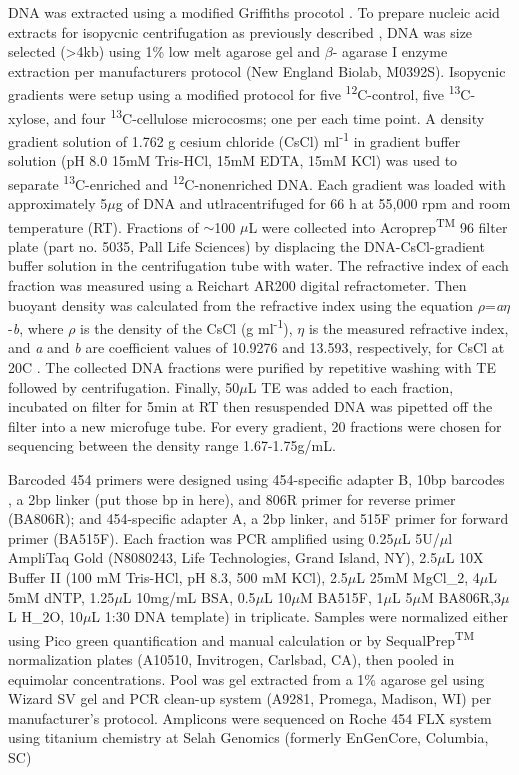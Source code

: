 DNA was extracted using a modified Griffiths procotol \cite{Griffiths_2000}. To prepare nucleic acid extracts for isopycnic centrifugation as previously described \cite{Buckley_2007}, DNA was size selected (\textgreater4kb) using 1\% low melt agarose gel and $\beta$- agarase I enzyme extraction per manufacturers protocol (New England Biolab, M0392S). Isopycnic gradients were setup using a modified protocol \cite{Neufeld_2007} for five \textsuperscript{12}C-control, five \textsuperscript{13}C-xylose, and four \textsuperscript{13}C-cellulose microcosms; one per each time point. A density gradient solution of 1.762 g cesium chloride (CsCl) ml\textsuperscript{-1} in gradient buffer solution (pH 8.0 15mM Tris-HCl, 15mM EDTA, 15mM KCl) was used to separate \textsuperscript{13}C-enriched and \textsuperscript{12}C-nonenriched DNA. Each gradient was loaded with approximately 5$\mu$g of DNA and utlracentrifuged for 66 h at 55,000 rpm and room temperature (RT). Fractions of $\sim$100 $\mu$L were collected into Acroprep\textsuperscript{TM} 96 filter plate (part no. 5035, Pall Life Sciences) by displacing the DNA-CsCl-gradient buffer solution in the centrifugation tube with water. The refractive index of each fraction was measured using a Reichart AR200 digital refractometer. Then buoyant density was calculated from the refractive index using the equation $\rho$=\textit{a}$\eta$-\textit{b}, where $\rho$ is the density of the CsCl (g ml\textsuperscript{-1}), $\eta$ is the measured refractive index, and \textit{a} and \textit{b} are coefficient values of 10.9276 and 13.593, respectively, for CsCl at 20{\textdegree}C \cite{9780408708036}. The collected DNA fractions were purified by repetitive washing with TE followed by centrifugation. Finally, 50$\mu$L TE was added to each fraction, incubated on filter for 5min at RT then resuspended DNA was pipetted off the filter into a new microfuge tube. For every gradient, 20 fractions were chosen for sequencing between the density range 1.67-1.75g/mL. 



Barcoded 454 primers were designed using 454-specific adapter B, 10bp barcodes \cite{Hamady_2008}, a 2bp linker (put those bp in here), and 806R primer for reverse primer (BA806R); and 454-specific adapter A, a 2bp linker, and 515F primer for forward primer (BA515F). Each fraction was PCR amplified using 0.25$\mu$L 5U/$\mu$l AmpliTaq Gold (N8080243, Life Technologies, Grand Island, NY), 2.5$\mu$L 10X Buffer II (100 mM Tris-HCl, pH 8.3, 500 mM KCl), 2.5$\mu$L 25mM MgCl_{2}, 4$\mu$L 5mM dNTP, 1.25$\mu$L 10mg/mL BSA, 0.5$\mu$L 10$\mu$M BA515F, 1$\mu$L 5$\mu$M BA806R,3$\mu$L H_{2}O, 10$\mu$L 1:30 DNA template) in triplicate. Samples were normalized either using Pico green quantification and manual calculation or by SequalPrep\textsuperscript{TM} normalization plates (A10510, Invitrogen, Carlsbad, CA), then pooled in equimolar concentrations.  Pool was gel extracted from a 1\% agarose gel using Wizard SV gel and PCR clean-up system (A9281, Promega, Madison, WI) per manufacturer's protocol.  Amplicons were sequenced on Roche 454 FLX system using titanium chemistry at Selah Genomics (formerly EnGenCore, Columbia, SC)  
